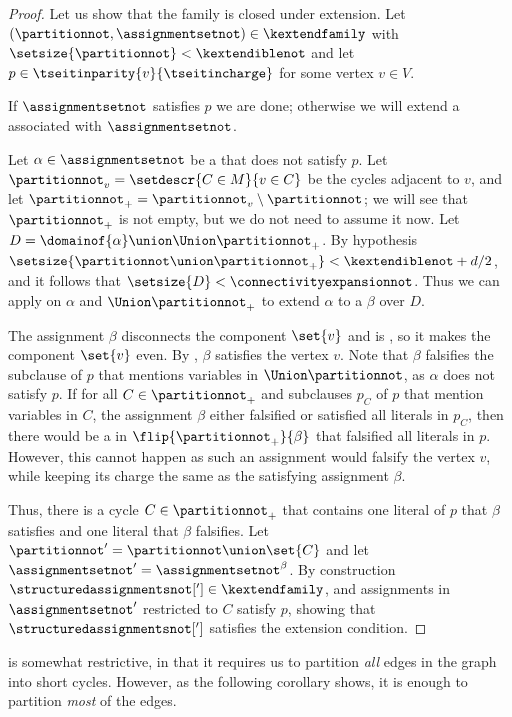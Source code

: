 \documentclass[11pt]{article}
\numberwithin{equation}{section}
\theoremstyle{definition}
\theoremstyle{plain}
\begin{document}
\begin{proof}
  Let us show that the family is closed under extension. Let $(\partitionnot,\assignmentsetnot)\in\kextendfamily$ with $\setsize{\partitionnot} < \kextendiblenot$ and let $p\in\tseitinparity{v}{\tseitincharge}$ for some vertex $v\in V$.

  If $\assignmentsetnot$ satisfies $p$ we are done; otherwise we will extend a \nonsplittingassignment associated with $\assignmentsetnot$.

  Let $\alpha\in\assignmentsetnot$ be a \nonsplittingassignment that does not satisfy $p$. Let $\partitionnot_v=\setdescr{C\in M}{v\in C}$ be the cycles adjacent to $v$, and let $\partitionnot_+=\partitionnot_v\setminus\partitionnot$; we will see that $\partitionnot_+$ is not empty, but we do not need to assume it now. Let $D=\domainof{\alpha}\union\Union\partitionnot_+$. By hypothesis $\setsize{\partitionnot\union\partitionnot_+} < \kextendiblenot + d/2$, and it follows that $\setsize{D} < \connectivityexpansionnot$. Thus we can apply  on $\alpha$ and $\Union\partitionnot_+$ to extend $\alpha$ to a \nonsplittingassignment $\beta$ over $D$.

The assignment $\beta$ disconnects the component $\set{v}$ and is \nonsplitting, so it makes the component $\set{v}$ even. By , $\beta$ satisfies the vertex $v$. Note that $\beta$ falsifies the subclause of $p$ that mentions variables in $\Union\partitionnot$, as $\alpha$ does not satisfy $p$. If for all $C\in\partitionnot_+$ and subclauses $p_C$ of $p$ that mention variables in $C$, the assignment $\beta$ either falsified or satisfied all literals in $p_C$, then there would be a \nonsplittingassignment in $\flip{\partitionnot_+}{\beta}$ that falsified all literals in $p$. However, this cannot happen as such an assignment would falsify the vertex $v$, while keeping its charge the same as the satisfying assignment $\beta$.

Thus, there is a cycle $C\in\partitionnot_+$ that contains one literal of $p$ that $\beta$ satisfies and one literal that $\beta$ falsifies. Let $\partitionnot'=\partitionnot\union\set{C}$ and let $\assignmentsetnot'=\assignmentsetnot^\beta$. By construction $\structuredassignmentsnot['] \in \kextendfamily$, and assignments in $\assignmentsetnot'$ restricted to $C$ satisfy $p$, showing that $\structuredassignmentsnot[']$ satisfies the extension condition.
\end{proof}

 is somewhat restrictive, in that it requires us to partition \emph{all} edges in the graph into short cycles. However, as the following corollary shows, it is enough to partition \emph{most} of the edges.
\end{document}
